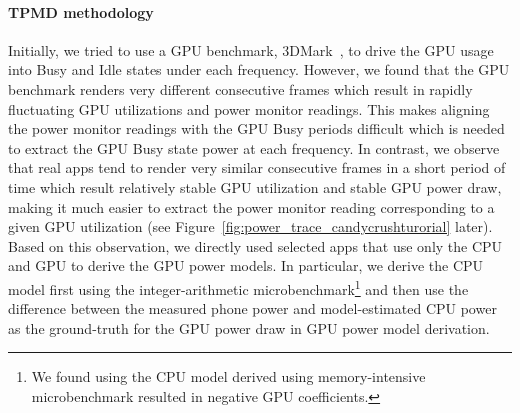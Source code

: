 \paragraph{TPMD methodology}
Initially, we tried to use a GPU benchmark, 3DMark~\cite{3DMark}, to drive the GPU usage into Busy and Idle states under each frequency.
However, we found that the GPU benchmark renders very different consecutive frames which
result in rapidly fluctuating GPU utilizations and power monitor readings.
This makes aligning the power monitor readings with the GPU Busy periods difficult
which is needed to extract the GPU Busy state power at each frequency.
%
%
In contrast, we observe that real apps tend to render very similar consecutive frames in a short period of time which result relatively stable GPU utilization and stable GPU power draw, 
making it much easier to extract the power monitor reading corresponding to a given GPU utilization
(see Figure~\ref{fig:power_trace_candycrushturorial} later). 
Based on this observation, we directly used selected apps that use 
only the CPU and GPU to derive the GPU power models. 
In particular, we derive the CPU model first using the integer-arithmetic microbenchmark\footnote{We found using the CPU model derived using memory-intensive microbenchmark
resulted in negative GPU coefficients.}
and then use the difference 
between the measured phone power and model-estimated CPU power as the ground-truth for the GPU power draw
in GPU power model derivation.


